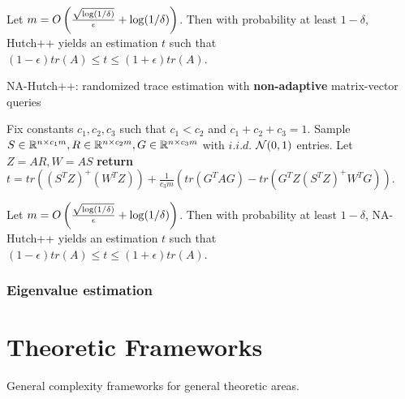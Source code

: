 \documentclass[10pt]{book}
\begin{document}
\begin{thm}
\label{tr_est_ada_alg}
Let $m=O\left(\frac{\sqrt{\log(1/\delta)}}{\epsilon}+\log(1/\delta)\right)$. Then with probability at least $1-\delta$, Hutch++ yields an estimation $t$ such that $(1-\epsilon)tr(A)\le t \le (1+\epsilon)tr(A)$.
\end{thm}
\pfsk{\ref{tr_est_ada_alg}}{

}

\bigskip
\begin{breakablealgorithm}
\caption{NA-Hutch++: randomized trace estimation with \textbf{non-adaptive} matrix-vector queries}
\label{na_hutch}
\begin{algorithmic}[1]
\State Fix constants $c_1,c_2,c_3$ such that $c_1<c_2$ and $c_1+c_2+c_3=1$.
\State Sample $S\in\mathbb{R}^{n\times c_1m},R\in\mathbb{R}^{n\times c_2m},G\in\mathbb{R}^{n\times c_3m}$ with $i.i.d.$ $\mathcal{N}(0,1)$ entries.
\State Let $Z=AR,W=AS$
\State \textbf{return} $t=tr((S^TZ)^+(W^TZ))+\frac{1}{c_3m}(tr(G^TAG)-tr(G^TZ(S^TZ)^+W^TG))$.
\end{algorithmic}
\end{breakablealgorithm}
\bigskip

\begin{thm}
\label{tr_est_nada_alg}
Let $m=O\left(\frac{\sqrt{\log(1/\delta)}}{\epsilon}+\log(1/\delta)\right)$. Then with probability at least $1-\delta$, NA-Hutch++ yields an estimation $t$ such that $(1-\epsilon)tr(A)\le t \le (1+\epsilon)tr(A)$.
\end{thm}
\pfsk{\ref{tr_est_nada_alg}}{

}

\subsection{Eigenvalue estimation}
\cite{braverman2021gradient}


\chapter{Theoretic Frameworks}
General complexity frameworks for general theoretic areas.
\end{document}
